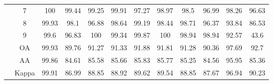 \begin{table}[htbp]
{\begin{tabular}{c c c c c c c c c c c c}
& 7 & 100 & 99.44 & 99.25 & 99.91 & 97.27 & 98.97 & 98.5 & 96.99 & 98.26 & 96.63 \\
& 8 & 99.93 & 98.1 & 96.88 & 98.64 & 99.19 & 98.44 & 98.71 & 96.37 & 93.84 & 86.53 \\
& 9 & 99.6 & 96.83 & 100 & 99.34 & 99.87 & 100 & 98.94 & 98.94 & 92.57 & 43.6 \\
& OA & 99.93 & 89.76 & 91.27 & 91.33 & 91.88 & 91.81 & 91.28 & 90.36 & 97.69 & 92.7 \\
& AA & 99.86 & 84.61 & 85.58 & 85.66 & 85.83 & 85.77 & 85.25 & 84.56 & 95.95 & 85.36 \\
& Kappa & 99.91 & 86.99 & 88.85 & 88.92 & 89.62 & 89.54 & 88.85 & 87.67 & 96.94 & 90.23 \\
\bottomrule
\end{tabular}
}
\end{table}

